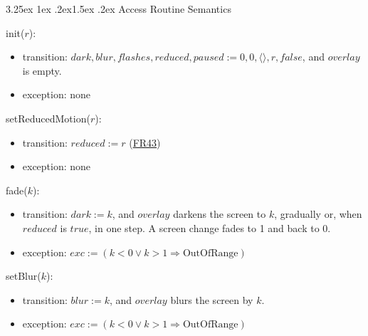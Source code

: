 \documentclass[10pt, titlepage]{article}
\makeatletter
\newcommand{\srsurl}{https://team-hindsight.github.io/ophthamology-game/SRS/SRS.pdf}
\newcommand{\srsitemref}[2]{\href{\srsurl\#nameddest=#1}{#2}}
\renewcommand\paragraph{\@startsection{paragraph}{4}{\z@}%
  {3.25ex \@plus 1ex \@minus .2ex}{1.5ex \@plus .2ex}%
  {\normalfont\normalsize\bfseries}}
\newcommand{\T}[1]{\mathit{#1}}          %
\newcommand{\exc}{\mathit{exc}}
\newcommand{\true}{\mathit{true}}
\newcommand{\false}{\mathit{false}}
\makeatother
\begin{document}
\paragraph{Access Routine Semantics}

\begin{samepage}
\noindent init($r$):
\begin{itemize}
\item transition: $\T{dark}, \T{blur}, \T{flashes}, \T{reduced}, \T{paused}
  := 0, 0, \langle\rangle, r, \false$, and $\T{overlay}$ is empty.
\item exception: none
\end{itemize}
\end{samepage}
\par\pagebreak[0]

\begin{samepage}
\noindent setReducedMotion($r$):
\begin{itemize}
\item transition: $\T{reduced} := r$ (\srsitemref{FR_Preferences}{FR43})
\item exception: none
\end{itemize}
\end{samepage}
\par\pagebreak[0]

\begin{samepage}
\noindent fade($k$):
\begin{itemize}
\item transition: $\T{dark} := k$, and $\T{overlay}$ darkens the screen to
  $k$, gradually or, when $\T{reduced}$ is $\true$, in one step. A screen
  change fades to 1 and back to 0.
\item exception: $\exc := (k < 0 \vee k > 1 \Rightarrow \text{OutOfRange})$
\end{itemize}
\end{samepage}
\par\pagebreak[0]

\begin{samepage}
\noindent setBlur($k$):
\begin{itemize}
\item transition: $\T{blur} := k$, and $\T{overlay}$ blurs the screen by $k$.
\item exception: $\exc := (k < 0 \vee k > 1 \Rightarrow \text{OutOfRange})$
\end{itemize}
\end{samepage}
\par\pagebreak[0]
\end{document}
